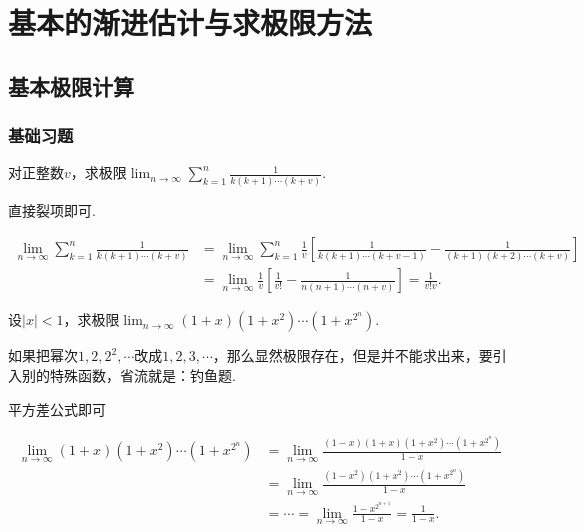 \documentclass[lang=cn,newtx,10pt,scheme=chinese]{elegantbook}
\begin{document}
\section{基本的渐进估计与求极限方法}

\subsection{基本极限计算}

\subsubsection{基础习题}

\begin{example}
   对正整数\(v\)，求极限\(\lim_{n\rightarrow\infty}\sum_{k = 1}^{n}\frac{1}{k(k + 1)\cdots(k + v)}\).
\end{example}
\begin{note}
   直接裂项即可.
\end{note}
\begin{solution}
   \begin{align*}
      \lim_{n\rightarrow \infty} \sum_{k=1}^n{\frac{1}{k(k+1)\cdots (k+v)}}&=\lim_{n\rightarrow \infty} \sum_{k=1}^n{\frac{1}{v}\left[ \frac{1}{k\left( k+1 \right) \cdots \left( k+v-1 \right)}-\frac{1}{\left( k+1 \right) \left( k+2 \right) \cdots \left( k+v \right)} \right]}
\\
&=\lim_{n\rightarrow \infty} \frac{1}{v}\left[ \frac{1}{v!}-\frac{1}{n\left( n+1 \right) \cdots \left( n+v \right)} \right] =\frac{1}{v!v}.
   \end{align*}
\end{solution}

\begin{example}
设\(\vert x\vert < 1\)，求极限\(\lim_{n\rightarrow\infty}(1 + x)(1 + x^2)\cdots(1 + x^{2^n})\).
\end{example}
\begin{remark}
   如果把幂次\(1,2,2^2,\cdots\)改成\(1,2,3,\cdots\)，那么显然极限存在，但是并不能求出来，要引入别的特殊函数，省流就是：钓鱼题.
\end{remark}
\begin{note}
   平方差公式即可
\end{note}
\begin{solution}
   \begin{align*}
\lim_{n\rightarrow \infty} (1+x)(1+x^2)\cdots (1+x^{2^n})&=\lim_{n\rightarrow \infty} \frac{(1-x)(1+x)(1+x^2)\cdots (1+x^{2^n})}{1-x}
\\
&=\lim_{n\rightarrow \infty} \frac{(1-x^2)(1+x^2)\cdots (1+x^{2^n})}{1-x}\\
&=\cdots =\lim_{n\rightarrow \infty} \frac{1-x^{2^{n+1}}}{1-x}=\frac{1}{1-x}.
\end{align*}
\end{solution}
\end{document}

